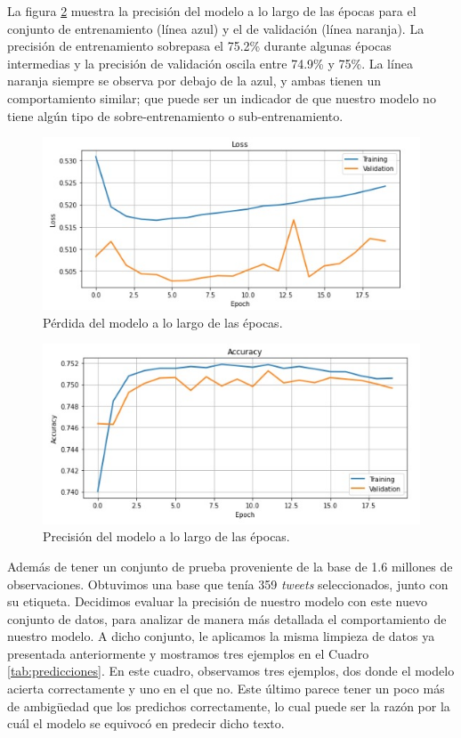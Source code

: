 \documentclass[sigconf, nonacm, spanish]{acmart}
\begin{document}
La figura \ref{fig:accuracy} muestra la precisión del modelo a lo largo de las épocas para el conjunto de entrenamiento (línea azul) y el de validación (línea naranja). La precisión de entrenamiento sobrepasa el 75.2\% durante algunas épocas intermedias y la precisión de validación oscila entre 74.9\% y 75\%. La línea naranja siempre se observa por debajo de la azul, y ambas tienen un comportamiento similar; que puede ser un indicador de que nuestro modelo no tiene algún tipo de sobre-entrenamiento o sub-entrenamiento.

\begin{figure}
  \centering
  \includegraphics[width=\linewidth]{figures/loss}
  \caption{Pérdida del modelo a lo largo de las épocas.}
  \label{fig:loss}
\end{figure}

\begin{figure}
  \centering
  \includegraphics[width=\linewidth]{figures/accuracy}
  \caption{Precisión del modelo a lo largo de las épocas.}
  \label{fig:accuracy}
\end{figure}

Además de tener un conjunto de prueba proveniente de la base de 1.6 millones de observaciones. Obtuvimos una base que tenía 359 \textit{tweets} seleccionados, junto con su etiqueta. Decidimos evaluar la precisión de nuestro modelo con este nuevo conjunto de datos, para analizar de manera más detallada el comportamiento de nuestro modelo. A dicho conjunto, le aplicamos la misma limpieza de datos ya presentada anteriormente y mostramos tres ejemplos en el Cuadro \ref{tab:predicciones}. En este cuadro, observamos tres ejemplos, dos donde el modelo acierta correctamente y uno en el que no. Este último parece tener un poco más de ambigüedad que los predichos correctamente, lo cual puede ser la razón por la cuál el modelo se equivocó en predecir dicho texto.
\end{document}
